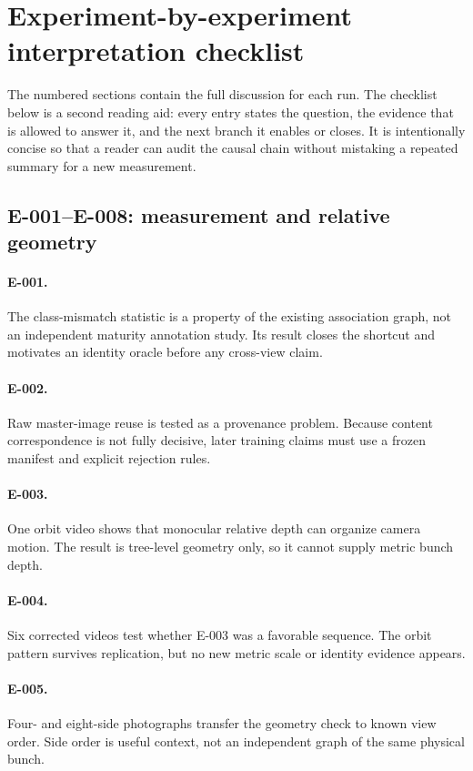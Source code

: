 \documentclass[preprint,12pt]{elsarticle}
\begin{document}
\section{Experiment-by-experiment interpretation checklist}
\label{app:experiment-checklist}
The numbered sections contain the full discussion for each run. The checklist
below is a second reading aid: every entry states the question, the evidence
that is allowed to answer it, and the next branch it enables or closes. It is
intentionally concise so that a reader can audit the causal chain without
mistaking a repeated summary for a new measurement.

\subsection{E-001--E-008: measurement and relative geometry}
\paragraph{E-001.} The class-mismatch statistic is a property of the existing
association graph, not an independent maturity annotation study. Its result
closes the shortcut and motivates an identity oracle before any cross-view
claim.
\paragraph{E-002.} Raw master-image reuse is tested as a provenance problem.
Because content correspondence is not fully decisive, later training claims
must use a frozen manifest and explicit rejection rules.
\paragraph{E-003.} One orbit video shows that monocular relative depth can
organize camera motion. The result is tree-level geometry only, so it cannot
supply metric bunch depth.
\paragraph{E-004.} Six corrected videos test whether E-003 was a favorable
sequence. The orbit pattern survives replication, but no new metric scale or
identity evidence appears.
\paragraph{E-005.} Four- and eight-side photographs transfer the geometry check
to known view order. Side order is useful context, not an independent graph of
the same physical bunch.
\end{document}
